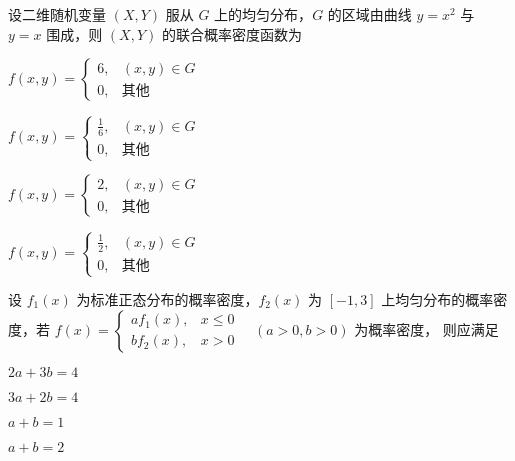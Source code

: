 \documentclass{exam-zh}
\begin{document}
\begin{question}
  设二维随机变量 $(X, Y)$ 服从 $G$ 上的均匀分布，$G$ 的区域由曲线 $y = x^2$ 与 $y = x$ 围成，则 $(X, Y)$ 的联合概率密度函数为 \paren[A]
  \begin{choices}
    \item 
    $f(x, y) =
    \begin{cases} 
    6, & (x, y) \in G \\
    0, & \text{其他}
    \end{cases}$
    
    \item 
    $f(x, y) =
    \begin{cases} 
    \frac{1}{6}, & (x, y) \in G \\
    0, & \text{其他}
    \end{cases}$
    
    \item 
    $f(x, y) =
    \begin{cases} 
    2, & (x, y) \in G \\
    0, & \text{其他}
    \end{cases}$
    
    \item 
    $f(x, y) =
    \begin{cases} 
    \frac{1}{2}, & (x, y) \in G \\
    0, & \text{其他}
    \end{cases}$
  \end{choices}
\end{question}

\begin{question}
  设 $f_1(x)$ 为标准正态分布的概率密度，$f_2(x)$ 为 $[-1, 3]$ 上均匀分布的概率密度，若  
  $f(x) = 
  \begin{cases} 
  af_1(x), & x \leq 0 \\ 
  bf_2(x), & x > 0 
  \end{cases} 
  \quad (a > 0, b > 0) \text{ 为概率密度，}$  
  则应满足 \paren[A]
  \begin{choices}
    \item $2a + 3b = 4$  
    \item $3a + 2b = 4$  
    \item $a + b = 1$  
    \item $a + b = 2$  
  \end{choices}
\end{question}
\end{document}
